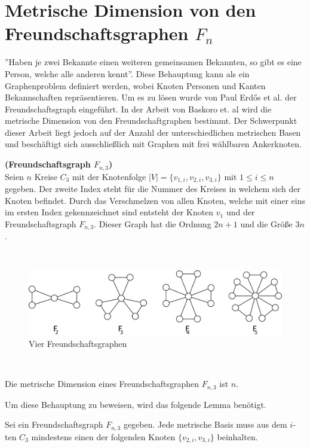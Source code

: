 \section{Metrische Dimension von den Freundschaftsgraphen $F_{n}$}
''Haben je zwei Bekannte einen weiteren gemeinsamen Bekannten, so gibt es eine Person, welche alle anderen kennt''. Diese Behauptung kann als ein Graphenproblem definiert werden, wobei Knoten Personen und Kanten Bekannschaften repräsentieren. Um es zu lösen wurde von Paul Erdős et al. \cite{Erdos} der Freundschaftsgraph eingeführt. In der Arbeit von Baskoro et. al \cite{amal} wird die metrische Dimension von den Freundschaftgraphen bestimmt. Der Schwerpunkt dieser Arbeit liegt jedoch auf der Anzahl der unterschiedlichen metrischen Basen und beschäftigt sich ausschließlich mit Graphen mit frei wählbaren Ankerknoten.
\begin{defi}{\textbf{(Freundschaftsgraph $F_{n,3}$)}}\\
Seien $n$ Kreise $C_{3}$ mit der Knotenfolge $|V|=\{v_{1,i},v_{2,i},v_{3,i}\}$  mit $1 \leq i \leq n$ gegeben. Der zweite Index steht für die Nummer des Kreises in welchem sich der Knoten befindet. Durch das Verschmelzen von allen Knoten, welche mit einer eins im ersten Index gekennzeichnet sind entsteht der Knoten $v_1$ und der Freundschaftsgraph $F_{n,3}$. Dieser Graph hat die Ordnung $2n+1$ und die Größe $3n$.
\end{defi}
\begin{bsp}~
\vspace{-3mm}
\begin{figure}[h!]
\centering
 		 \includegraphics[width=350pt]{bilder/freunschaftsgraph.pdf}
   \caption{Vier Freundschaftsgraphen}
   \label{bild:fg}
\end{figure}
\end{bsp}
~\linebreak
\begin{lem}
\label{Freundschaftsgraphen}
Die metrische Dimension eines Freundschaftsgraphen $F_{n,3}$ ist $n$.
\end{lem}
Um diese Behauptung zu beweisen, wird das folgende Lemma benötigt. 
\begin{lem}
\label{mindfreundschaftsgraph}
Sei ein Freundschaftsgraph $F_{n,3}$ gegeben. Jede metrische Basis muss aus dem $i$-ten $C_3$ mindestens einen der folgenden Knoten $\{v_{2,i},v_{3,i}\}$ beinhalten. 
\end{lem}

